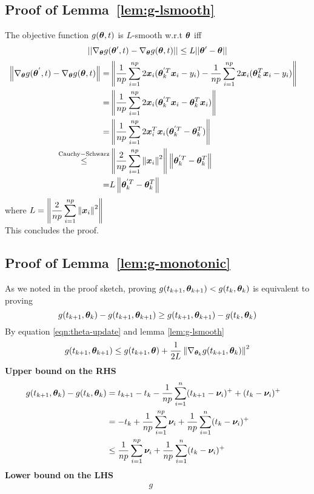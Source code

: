 \documentclass{article} %
\newcommand{\norm}[1]{\left\lVert#1\right\rVert}
\begin{document}
\begin{appendices}
	\subsection{Proof of Lemma~\ref{lem:g-lsmooth}}
	The objective function 
	$\displaystyle g({\bm{\theta}},t)$ is $L$-smooth w.r.t ${\bm{\theta}}$ iff
	\begin{equation}
		||  \nabla_{\bm{\theta}} g({\bm{\theta}}',t) - \nabla_{\bm{\theta}} g({\bm{\theta}},t) || \leq L|| {\bm{\theta}}' - {\bm{\theta}} || 
	\end{equation}
	\begin{align}
		\norm{ \nabla_{\vtheta} g(\vtheta^{'},t) - \nabla_{\vtheta} g(\vtheta,t) } = &\norm{ \frac{1}{np}\sum_{i=1}^{np}2\vx_i(\vtheta_k^{'T} \vx_i - y_i) - \frac{1}{np}\sum_{i=1}^{np}2\vx_i(\vtheta_k^T \vx_i - y_i) } &&\\
		= &\norm{\frac{1}{np}\sum_{i=1}^{np}2\vx_i(\vtheta_k^{'T}\vx_i - \vtheta_k^T\vx_i)}&&\\
		= &\norm{\frac{1}{np}\sum_{i=1}^{np}2\vx_i^T\vx_i(\vtheta_k^{'T} - \vtheta_k^T)} &&\\
		\overset{\mathrm{Cauchy-Schwarz}}{\leq} &\norm{\frac{2}{np}\sum_{i=1}^{np}\norm{\vx_i}^2}\norm{\vtheta_k^{'T} - \vtheta_k^T} &&\\
		= &L\norm{\vtheta_k^{'T} - \vtheta_k^T} &&
	\end{align}
	where $\displaystyle L = \norm{\frac{2}{np}\sum_{i=1}^{np}\norm{\vx_i}^2}$\\
	This concludes the proof.
	
	\subsection{Proof of Lemma~\ref{lem:g-monotonic}}
	As we noted in the proof sketch, proving $g(t_{k+1}, {\bm{\theta}}_{k+1}) < g(t_k, {\bm{\theta}}_k)$ is equivalent to proving 
	\vspace{1em}
	\begin{equation}
		g(t_{k+1},{\bm{\theta}}_k) - g(t_{k+1},{\bm{\theta}}_{k+1}) \geq g(t_{k+1},{\bm{\theta}}_{k+1}) - g(t_k,{\bm{\theta}}_k)
	\end{equation}
	By equation \ref{eqn:theta-update} and lemma \ref{lem:g-lsmooth}
	\begin{equation}
		g(t_{k+1},\vtheta_{k+1}) \leq g(t_{k+1},\vtheta) + \frac{1}{2L} \norm{\nabla_{\vtheta_k}g(t_{k+1},\vtheta_k) }^2
	\end{equation}
	\textbf{Upper bound on the RHS}
	\begin{align}
		g(t_{k+1},{\bm{\theta}}_k) - g(t_k,{\bm{\theta}}_k) &= t_{k+1} - t_k - \frac{1}{np}\sum_{i=1}^{n}(t_{k+1} - {\bm{\nu}}_i)^+ + (t_k - {\bm{\nu}}_i)^+ &&\\
		&= -t_k + \frac{1}{np}\sum_{i=1}^{np}{\bm{\nu}}_i + \frac{1}{np}\sum_{i=1}^{n}(t_k - {\bm{\nu}}_i)^+ &&\\
		&\leq \frac{1}{np}\sum_{i=1}^{np}{\bm{\nu}}_i + \frac{1}{np}\sum_{i=1}^n(t_k - {\bm{\nu}}_i)^+ &&
	\end{align}
	\textbf{Lower bound on the LHS}
	\begin{align}
		g &&
	\end{align}
	

\end{appendices}
\end{document}
